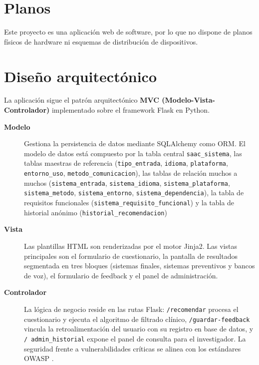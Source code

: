 
\section{Planos}
Este proyecto es una aplicación web de software, por lo que no dispone de planos físicos de hardware ni esquemas de distribución de dispositivos.


\section{Diseño arquitectónico}
La aplicación sigue el patrón arquitectónico \textbf{MVC (Modelo-Vista-Controlador)} implementado sobre el framework Flask en Python. \cite{grinberg:flask}

\begin{description}
 	\item[\textbf{Modelo}] Gestiona la persistencia de datos mediante SQLAlchemy como ORM. El modelo de datos está compuesto por la tabla central \texttt{saac\_sistema}, las tablas maestras de referencia (\texttt{tipo\_entrada}, \texttt{idioma}, \texttt{plataforma}, 					\texttt{entorno\_uso}, \texttt{metodo\_comunicacion}), las tablas de relación muchos a muchos (\texttt{sistema\_entrada}, \texttt{sistema\_idioma}, \texttt{sistema\_plataforma}, \texttt{sistema\_metodo}, \texttt{sistema\_entorno}, \texttt{sistema\_dependencia}), la tabla de requisitos 		funcionales (\texttt{sistema\_requisito\_funcional}) y la tabla de historial anónimo (\texttt{historial\_recomendacion})
 	\item[\textbf{Vista}] Las plantillas HTML son renderizadas por el motor Jinja2. Las vistas principales son el formulario de cuestionario, la pantalla de resultados segmentada en tres bloques (sistemas finales, sistemas preventivos y bancos de voz), el formulario de feedback y el panel 		de administración.
 	\item[\textbf{Controlador}] La lógica de negocio reside en las rutas Flask: \texttt{/recomendar} procesa el cuestionario y ejecuta el algoritmo de filtrado clínico, \texttt{/guardar-feedback} vincula la retroalimentación del usuario con su registro en base de datos, y \texttt{/				admin\_historial} expone el panel de consulta para el investigador. La seguridad frente a vulnerabilidades críticas se alinea con los estándares OWASP \cite{owasp:top10}.
\end{description}


